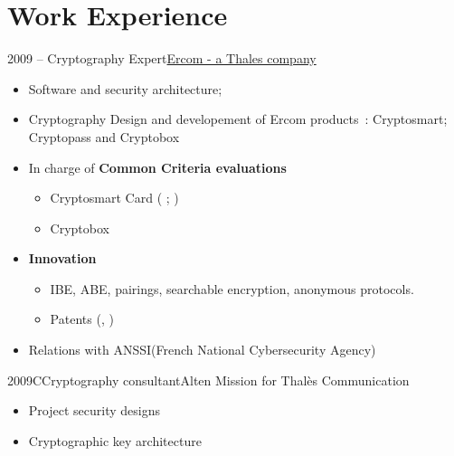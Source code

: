 \documentclass[a4paper]{customcv}
\begin{document}
\makeprofile
\section{Work Experience}

\begin{cventry}{2009 -- }{Cryptography Expert}{\href{https://www.ercom.fr/}{Ercom - a Thales company}}
  \begin{itemize}
    \item Software and security architecture;
    \item Cryptography Design and developement of Ercom products~:\linebreak
          Cryptosmart; Cryptopass and Cryptobox
    \item In charge of \textbf{Common Criteria evaluations}
          \begin{itemize}
            \item Cryptosmart Card (\cite{anssi.2012/71} ; \cite{anssi.2016/69})
            \item Cryptobox \cite{anssi.2018/23}
          \end{itemize}
    \item \textbf{Innovation}
          \begin{itemize}
            \item IBE, ABE, pairings, searchable encryption, anonymous protocols.
            \item Patents (\cite{pat.save}, \cite{pat.card.auth})
          \end{itemize}
    \item Relations with ANSSI(French National Cybersecurity Agency)
  \end{itemize}
\end{cventry}

\begin{cventry}{2009}{CCryptography consultant}{Alten}
  Mission for Thalès Communication
  \begin{itemize}
    \item Project security designs
    \item Cryptographic key architecture
  \end{itemize}
\end{cventry}
\end{document}
